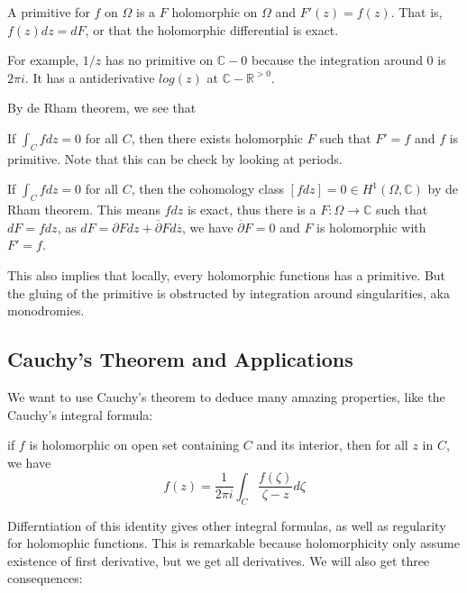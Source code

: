\documentclass[main.tex]{subfiles}
\begin{document}
\begin{definition}

A primitive for $f$ on $\Omega$ is a $F$ holomorphic on $\Omega$ and $F'(z) = f(z)$. 
That is, $f(z) dz = dF$, or that the holomorphic differential is exact. 
\end{definition}

For example, $1/z$ has no primitive on $\mathbb{C}-0$ because the integration around $0$ is $2\pi i$. It has a antiderivative $log(z)$ at $\mathbb{C} - \mathbb{R}^{>0}$.



By de Rham theorem, we see that 
\begin{theorem}
If $\int_C f dz = 0$ for all $C$, then there exists holomorphic $F$ such that $F' = f$ and $f$ is primitive. Note that this can be check by looking at periods.
\end{theorem}

\begin{theorem}
If $\int_C f dz = 0$ for all $C$, then the cohomology class $[f dz] = 0 \in H^1(\Omega, \mathbb{C})$  by de Rham theorem. This means $f dz$ is exact, thus there is a $F: \Omega \rightarrow \mathbb{C}$ such that $dF = f dz$, as $dF = \partial F dz + \overline{\partial} F d\overline{z}$, we have $\overline{\partial} F = 0$ and $F$ is holomorphic with $F' = f$.
\end{theorem}

This also implies that locally, every holomorphic functions has a primitive. But the gluing of the primitive is obstructed by integration around singularities, aka monodromies.

\subsection{Cauchy's Theorem and Applications}
We want to use Cauchy's theorem to deduce many amazing properties, like the Cauchy's integral formula:

\begin{theorem}
if $f$ is holomorphic on open set containing $C$ and its interior, then for all $z$ in $C$, we have 
$$
f(z) = \frac{1}{2\pi i} \int_C \frac{f(\zeta)}{\zeta - z} d\zeta
$$
\end{theorem}

Differntiation of this identity gives other integral formulas, as well as regularity for holomophic functions. This is remarkable because holomorphicity only assume existence of first derivative, but we get all derivatives. We will also get three consequences:
\end{document}
